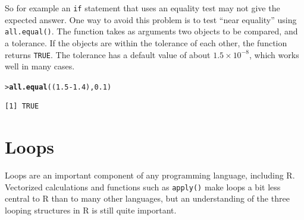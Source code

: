 \documentclass[12pt,oneside]{book}\usepackage[]{graphicx}\usepackage[]{color}
\makeatletter
\newcommand{\hlnum}[1]{\textcolor[rgb]{0.686,0.059,0.569}{#1}}%
\newcommand{\hlopt}[1]{\textcolor[rgb]{0,0,0}{#1}}%
\newcommand{\hlstd}[1]{\textcolor[rgb]{0.345,0.345,0.345}{#1}}%
\newcommand{\hlkwd}[1]{\textcolor[rgb]{0.737,0.353,0.396}{\textbf{#1}}}%
\newenvironment{kframe}{%
 \def\at@end@of@kframe{}%
 \ifinner\ifhmode%
  \def\at@end@of@kframe{\end{minipage}}%
  \begin{minipage}{\columnwidth}%
 \fi\fi%
 \def\FrameCommand##1{\hskip\@totalleftmargin \hskip-\fboxsep
 \colorbox{shadecolor}{##1}\hskip-\fboxsep
     \hskip-\linewidth \hskip-\@totalleftmargin \hskip\columnwidth}%
 \MakeFramed {\advance\hsize-\width
   \@totalleftmargin\z@ \linewidth\hsize
   \@setminipage}}%
 {\par\unskip\endMakeFramed%
 \at@end@of@kframe}
\newenvironment{knitrout}{}{} %
\newcommand{\Rfunc}[1]{\texttt{#1}}
\makeatother
\begin{document}
So for example an \verb+if+ statement that uses an equality test may not give the expected answer. 
One way to avoid this problem is to test ``near equality'' using \Rfunc{all.equal()}. The function takes as arguments two objects to be compared, and a tolerance. If the objects are within the tolerance of each other, the function returns \verb+TRUE+. The tolerance has a default value of about $1.5\times 10^{-8}$, which works well in many cases.
\begin{knitrout}
\color{fgcolor}\begin{kframe}
\begin{alltt}
\hlstd{> }\hlkwd{all.equal}\hlstd{((}\hlnum{1.5} \hlopt{-} \hlnum{1.4}\hlstd{),} \hlnum{0.1}\hlstd{)}
\end{alltt}
\begin{verbatim}
[1] TRUE
\end{verbatim}
\end{kframe}
\end{knitrout}
\section{Loops}
Loops are an important component of any programming language, including R. Vectorized calculations and functions such as \Rfunc{apply()} make loops a bit less central to R than to many other languages, but an understanding of the three looping structures in R is still quite important.
\end{document}
